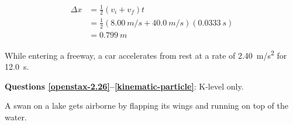 \documentclass[../main-physics-problems.tex]{subfiles}
\begin{document}
\begin{questions}
\begin{solution}
\begin{align*}
    \Delta x &= \frac{1}{2} \left(v_i + v_f\right) t \\[1ex]
    &= \frac{1}{2} \left(\SI{8.00}{m/s} + \SI{40.0}{m/s}\right)(\SI{0.0333}{s}) \\[1ex]
    &= \boxed{\SI{0.799}{m}}
\end{align*}
\end{solution}

\question %
While entering a freeway, a car accelerates from rest at a rate of \SI{2.40}{m/s^2} for \SI{12.0}{s}. 


\begin{EnvUplevel}
    \textbf{Questions \ref{openstax-2.26}--\ref{kinematic-particle}}: K-level only.
\end{EnvUplevel}






\question \label{openstax-2.31}
A swan on a lake gets airborne by flapping its wings and running on top of the water. 


\end{questions}
\end{document}
